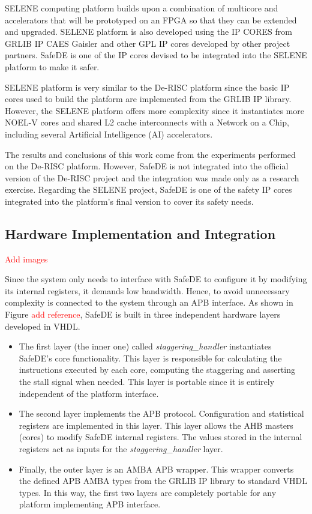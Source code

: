 SELENE computing platform builds upon a combination of multicore and accelerators that will be prototyped on an FPGA so that they can be extended and upgraded. SELENE platform is also developed using the IP CORES from GRLIB IP CAES Gaisler and other GPL IP cores developed by other project partners. SafeDE is one of the IP cores devised to be integrated into the SELENE platform to make it safer.

SELENE platform is very similar to the De-RISC platform since the basic IP cores used to build the platform are implemented from the GRLIB IP library. However, the SELENE platform offers more complexity since it instantiates more NOEL-V cores and shared L2 cache interconnects with a Network on a Chip, including several Artificial Intelligence (AI) accelerators.

The results and conclusions of this work come from the experiments performed on the De-RISC platform. However, SafeDE is not integrated into the official version of the De-RISC project and the integration was made only as a research exercise. Regarding the SELENE project, SafeDE is one of the safety IP cores integrated into the platform's final version to cover its safety needs.
\bigskip

\subsection{Hardware Implementation and Integration}
\textcolor{red}{Add images}

Since the system only needs to interface with SafeDE to configure it by modifying its internal registers, it demands low bandwidth. Hence, to avoid unnecessary complexity is connected to the system through an APB interface. As shown in Figure \textcolor{red}{add reference}, SafeDE is built in three independent hardware layers developed in VHDL. 

\begin{itemize}
    \item The first layer (the inner one) called \textit{staggering\_handler} instantiates SafeDE's core functionality. This layer is responsible for calculating the instructions executed by each core, computing the staggering and asserting the stall signal when needed. This layer is portable since it is entirely independent of the platform interface. 
    \item The second layer implements the APB protocol. Configuration and statistical registers are implemented in this layer. This layer allows the AHB masters (cores) to modify SafeDE internal registers. The values stored in the internal registers act as inputs for the \textit{staggering\_handler} layer.
    \item Finally, the outer layer is an AMBA APB wrapper. This wrapper converts the defined APB AMBA types from the GRLIB IP library to standard VHDL types. In this way, the first two layers are completely portable for any platform implementing APB interface.
\end{itemize}

